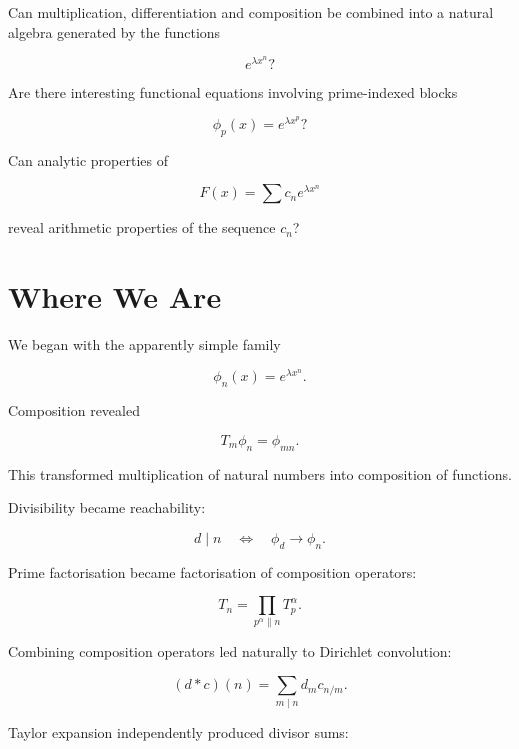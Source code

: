 \begin{question}

Can multiplication, differentiation and composition be combined into
a natural algebra generated by the functions

\[
e^{\lambda x^n}?
\]

\end{question}

\begin{question}

Are there interesting functional equations involving prime-indexed
blocks

\[
\phi_p(x)=e^{\lambda x^p}?
\]

\end{question}

\begin{question}

Can analytic properties of

\[
F(x)
=
\sum c_ne^{\lambda x^n}
\]

reveal arithmetic properties of the sequence \(c_n\)?

\end{question}

\section{Where We Are}

We began with the apparently simple family

\[
\phi_n(x)=e^{\lambda x^n}.
\]

Composition revealed

\[
T_m\phi_n=\phi_{mn}.
\]

This transformed multiplication of natural numbers into composition
of functions.

Divisibility became reachability:

\[
d\mid n
\quad\Longleftrightarrow\quad
\phi_d
\longrightarrow
\phi_n.
\]

Prime factorisation became factorisation of composition operators:

\[
T_n
=
\prod_{p^\alpha\parallel n}
T_p^\alpha.
\]

Combining composition operators led naturally to Dirichlet
convolution:

\[
(d*c)(n)
=
\sum_{m\mid n}
d_m c_{n/m}.
\]

Taylor expansion independently produced divisor sums:

